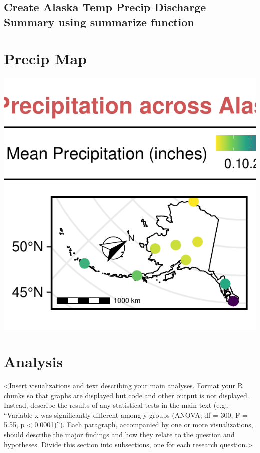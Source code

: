 \documentclass[12pt,]{article}
\begin{document}
\hypertarget{create-alaska-temp-precip-discharge-summary-using-summarize-function}{%
\subsection{Create Alaska Temp Precip Discharge Summary using summarize
function}\label{create-alaska-temp-precip-discharge-summary-using-summarize-function}}

\hypertarget{precip-map}{%
\section{Precip Map}\label{precip-map}}

\includegraphics{Project_Report_v2_files/figure-latex/unnamed-chunk-5-1.pdf}
\newpage

\hypertarget{analysis}{%
\section{Analysis}\label{analysis}}

\textless{}Insert visualizations and text describing your main analyses.
Format your R chunks so that graphs are displayed but code and other
output is not displayed. Instead, describe the results of any
statistical tests in the main text (e.g., ``Variable x was significantly
different among y groups (ANOVA; df = 300, F = 5.55, p \textless{}
0.0001)''). Each paragraph, accompanied by one or more visualizations,
should describe the major findings and how they relate to the question
and hypotheses. Divide this section into subsections, one for each
research question.\textgreater{}
\end{document}
